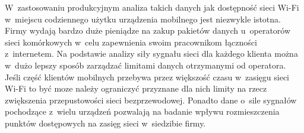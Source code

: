 W~zastosowaniu produkcyjnym analiza takich danych jak dostępność sieci
Wi-Fi w~miejscu codziennego użytku urządzenia mobilnego jest niezwykle
istotna. Firmy wydają bardzo duże pieniądze na zakup pakietów danych
u~operatorów sieci komórkowych w~celu zapewnienia swoim pracownikom
łączności z~internetem. Na podstawie analizy siły sygnału sieci dla
każdego klienta można w~dużo lepszy sposób zarządzać limitami danych
otrzymanymi od operatora. Jeśli część klientów mobilnych przebywa
przez większość czasu w~zasięgu sieci Wi-Fi to być moze należy
ograniczyć przyznane dla nich limity na rzecz zwiększenia
przepustowości sieci bezprzewodowej. Ponadto dane o~sile sygnałów
pochodzące z~wielu urządzeń pozwalają na badanie wpływu rozmieszczenia
punktów dostępowych na zasięg sieci w~siedzibie firmy.
